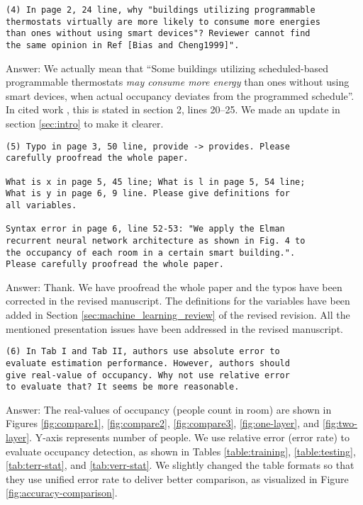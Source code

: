 \begin{verbatim}
(4) In page 2, 24 line, why "buildings utilizing programmable
thermostats virtually are more likely to consume more energies
than ones without using smart devices"? Reviewer cannot find
the same opinion in Ref [Bias and Cheng1999]".
\end{verbatim}
Answer: We actually mean that ``Some buildings utilizing scheduled-based
programmable thermostats \emph{may consume more energy} than ones without using
smart devices, when actual occupancy deviates from the programmed schedule''.
In cited work \cite{bias1999elec}, this is stated in section 2, lines 20--25.
We made an update in section \ref{sec:intro} to make it clearer.

\begin{verbatim}
(5) Typo in page 3, 50 line, provide -> provides. Please
carefully proofread the whole paper.

What is x in page 5, 45 line; What is l in page 5, 54 line;
What is y in page 6, 9 line. Please give definitions for
all variables.

Syntax error in page 6, line 52-53: "We apply the Elman
recurrent neural network architecture as shown in Fig. 4 to
the occupancy of each room in a certain smart building.".
Please carefully proofread the whole paper.
\end{verbatim}
Answer: Thank. We have proofread the whole paper and the typos have been corrected in
the revised manuscript. The definitions for the variables have been added in
Section \ref{sec:machine_learning_review} of the revised revision. All the mentioned presentation issues have
been addressed in the revised manuscript.

\begin{verbatim}
(6) In Tab I and Tab II, authors use absolute error to
evaluate estimation performance. However, authors should
give real-value of occupancy. Why not use relative error
to evaluate that? It seems be more reasonable.
\end{verbatim}
Answer: The real-values of occupancy (people count in room) are shown in Figures
\ref{fig:compare1}, \ref{fig:compare2}, \ref{fig:compare3},
\ref{fig:one-layer}, and \ref{fig:two-layer}. Y-axis represents number of
people. We use relative error (error rate) to evaluate occupancy detection, as
shown in Tables \ref{table:training}, \ref{table:testing}, \ref{tab:terr-stat},
and \ref{tab:verr-stat}. We slightly changed the table formats so that they use
unified error rate to deliver better comparison, as visualized in Figure
\ref{fig:accuracy-comparison}.

